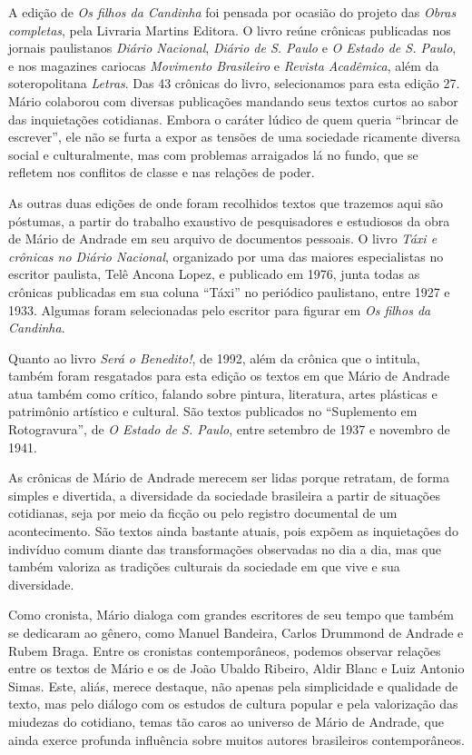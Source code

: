 A edição de \emph{Os filhos da Candinha} foi pensada por ocasião do
projeto das \emph{Obras completas}, pela Livraria Martins Editora. O
livro reúne crônicas publicadas nos jornais paulistanos \emph{Diário
Nacional}, \emph{Diário de S. Paulo} e \emph{O Estado de S. Paulo}, e
nos magazines cariocas \emph{Movimento Brasileiro} e \emph{Revista
Acadêmica}, além da soteropolitana \emph{Letras}. Das 43 crônicas do
livro, selecionamos para esta edição 27. Mário colaborou com diversas
publicações mandando seus textos curtos ao sabor das inquietações
cotidianas. Embora o caráter lúdico de quem queria ``brincar de
escrever'', ele não se furta a expor as tensões de uma sociedade
ricamente diversa social e culturalmente, mas com problemas arraigados
lá no fundo, que se refletem nos conflitos de classe e nas relações de
poder.

As outras duas edições de onde foram recolhidos textos que trazemos aqui
são póstumas, a partir do trabalho exaustivo de pesquisadores e
estudiosos da obra de Mário de Andrade em seu arquivo de documentos
pessoais. O livro \emph{Táxi e crônicas no Diário Nacional}, organizado
por uma das maiores especialistas no escritor paulista, Telê Ancona
Lopez, e publicado em 1976, junta todas as crônicas publicadas em sua
coluna ``Táxi'' no periódico paulistano, entre 1927 e 1933. Algumas
foram selecionadas pelo escritor para figurar em \emph{Os filhos da
Candinha}.

Quanto ao livro \emph{Será o Benedito!}, de 1992, além da crônica que o
intitula, também foram resgatados para esta edição os textos em que
Mário de Andrade atua também como crítico, falando sobre pintura,
literatura, artes plásticas e patrimônio artístico e cultural. São
textos publicados no ``Suplemento em Rotogravura'', de \emph{O Estado de
S. Paulo}, entre setembro de 1937 e novembro de 1941.

As crônicas de Mário de Andrade merecem ser lidas porque retratam, de
forma simples e divertida, a diversidade da sociedade brasileira a
partir de situações cotidianas, seja por meio da ficção ou pelo registro
documental de um acontecimento. São textos ainda bastante atuais, pois
expõem as inquietações do indivíduo comum diante das transformações
observadas no dia a dia, mas que também valoriza as tradições culturais
da sociedade em que vive e sua diversidade.

Como cronista, Mário dialoga com grandes escritores de seu tempo que
também se dedicaram ao gênero, como Manuel Bandeira, Carlos Drummond de
Andrade e Rubem Braga. Entre os cronistas contemporâneos, podemos
observar relações entre os textos de Mário e os de João Ubaldo Ribeiro,
Aldir Blanc e Luiz Antonio Simas. Este, aliás, merece destaque, não
apenas pela simplicidade e qualidade de texto, mas pelo diálogo com os
estudos de cultura popular e pela valorização das miudezas do cotidiano,
temas tão caros ao universo de Mário de Andrade, que ainda exerce
profunda influência sobre muitos autores brasileiros contemporâneos.



